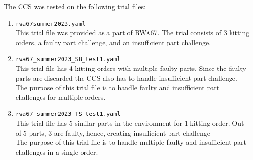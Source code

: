 \documentclass{uva-inf-article}
\begin{document}
\noindent The CCS was tested on the following trial files:\\
\begin{enumerate}
    \item \justifying \verb|rwa67summer2023.yaml|\\
        This trial file was provided as a part of RWA67.  The trial consists of 3 kitting orders, a faulty part challenge, and an insufficient part challenge.
    \item \justifying \verb|rwa67_summer2023_SB_test1.yaml|\\
        This trial file has 4 kitting orders with multiple faulty parts. Since the faulty parts are discarded the CCS also has to handle insufficient part challenge.\\
        The purpose of this trial file is to handle faulty and insufficient part challenges for multiple orders.\\
    \item \justifying \verb|rwa67_summer2023_TS_test1.yaml|\\
        This trial file has 5 similar parts in the environment for 1 kitting order. Out of 5 parts, 3 are faulty, hence, creating insufficient part challenge.\\
        The purpose of this trial file is to handle multiple faulty and insufficient part challenges in a single order.\\
 \end{enumerate}
\end{document}
